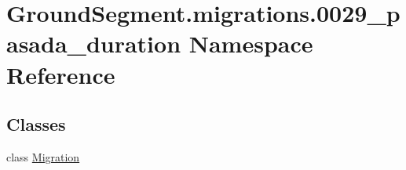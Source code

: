\hypertarget{namespace_ground_segment_1_1migrations_1_10029__pasada__duration}{}\section{Ground\+Segment.\+migrations.0029\+\_\+pasada\+\_\+duration Namespace Reference}
\label{namespace_ground_segment_1_1migrations_1_10029__pasada__duration}
\subsection*{Classes}
\begin{DoxyCompactItemize}
\item 
class \hyperlink{class_ground_segment_1_1migrations_1_10029__pasada__duration_1_1_migration}{Migration}
\end{DoxyCompactItemize}
